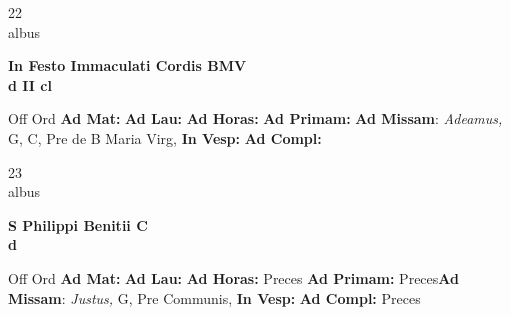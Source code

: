\documentclass[10pt, openany]{book}
\begin{document}
    \begin{center}
        \begin{minipage}{3.5in}
            \vspace{2em}
            \begin{minipage}{0.5in}
                {\Huge 22} \\
                {\normalsize albus}
            \end{minipage}
            \begin{minipage}{3.0in}
                \textbf{ \large In Festo Immaculati Cordis BMV \\
                \textnormal{\normalsize d II cl}}

            \end{minipage}
            \begin{justify}Off Ord
                \textbf{Ad Mat: }
                \textbf{Ad Lau: }
                \textbf{Ad Horas: }
                \textbf{Ad Primam: }\textbf{Ad Missam}: \textit{Adeamus,} G, C, Pre de B Maria Virg, 
                \textbf{In Vesp: }
                \textbf{Ad Compl: }
            \end{justify}
        \end{minipage}
    \end{center}

    \begin{center}
        \begin{minipage}{3.5in}
            \vspace{2em}
            \begin{minipage}{0.5in}
                {\Huge 23} \\
                {\normalsize albus}
            \end{minipage}
            \begin{minipage}{3.0in}
                \textbf{ \large S Philippi Benitii C \\
                \textnormal{\normalsize d}}

            \end{minipage}
            \begin{justify}Off Ord
                \textbf{Ad Mat: }
                \textbf{Ad Lau: }
                \textbf{Ad Horas: }Preces
                \textbf{Ad Primam: }Preces\textbf{Ad Missam}: \textit{Justus,} G, Pre Communis, 
                \textbf{In Vesp: }
                \textbf{Ad Compl: }Preces
            \end{justify}
        \end{minipage}
    \end{center}
\end{document}
